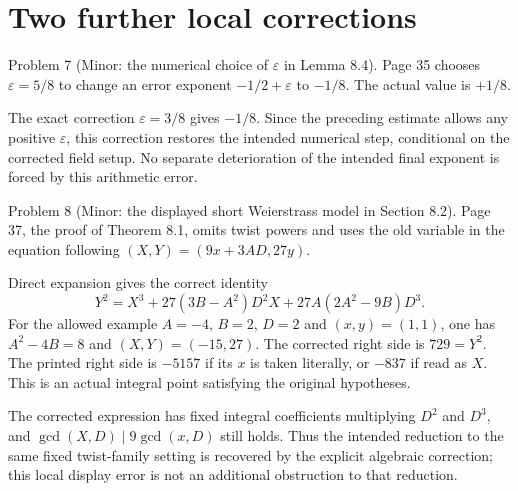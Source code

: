 \documentclass[10pt]{article}
\begin{document}
\section*{Two further local corrections}
Problem 7 (Minor: the numerical choice of \(\varepsilon\) in Lemma 8.4).  Page 35 chooses \(\varepsilon=5/8\) to change an error exponent \(-1/2+\varepsilon\) to \(-1/8\). The actual value is \(+1/8\).\par
The exact correction \(\varepsilon=3/8\) gives \(-1/8\). Since the preceding estimate allows any positive \(\varepsilon\), this correction restores the intended numerical step, conditional on the corrected field setup. No separate deterioration of the intended final exponent is forced by this arithmetic error.\par
Problem 8 (Minor: the displayed short Weierstrass model in Section 8.2).  Page 37, the proof of Theorem 8.1, omits twist powers and uses the old variable in the equation following \((X,Y)=(9x+3AD,27y)\).\par
Direct expansion gives the correct identity \[Y^2=X^3+27(3B-A^2)D^2X+
             27A(2A^2-9B)D^3.\] For the allowed example \(A=-4\), \(B=2\), \(D=2\) and \((x,y)=(1,1)\), one has \(A^2-4B=8\) and \((X,Y)=(-15,27)\). The corrected right side is \(729=Y^2\). The printed right side is \(-5157\) if its \(x\) is taken literally, or \(-837\) if read as \(X\). This is an actual integral point satisfying the original hypotheses.\par
The corrected expression has fixed integral coefficients multiplying \(D^2\) and \(D^3\), and \(\gcd(X,D)\mid9\gcd(x,D)\) still holds. Thus the intended reduction to the same fixed twist-family setting is recovered by the explicit algebraic correction; this local display error is not an additional obstruction to that reduction.\par
\end{document}
